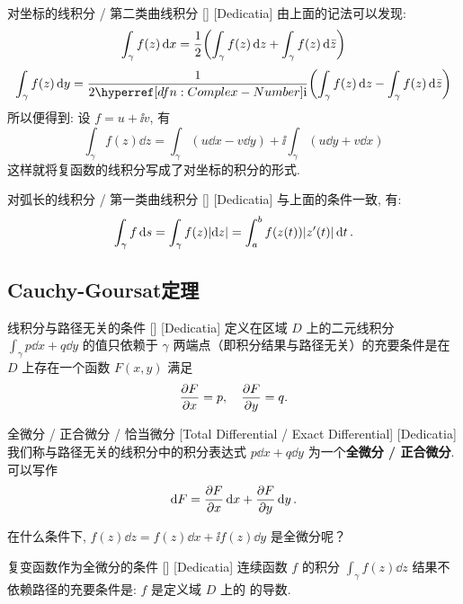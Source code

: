         \begin{ppt}
            {对坐标的线积分 / 第二类曲线积分}
            []
            [Dedicatia]
            由上面的记法可以发现: 
            \[\int_\gamma f(z)\dd{x}=\frac{1}{2}\qty(\int_\gamma f(z)\dd{z}+\int_\gamma f(z)\dd{\bar{z}})\]
            \[\int_\gamma f(z)\dd{y}=\frac{1}{2\ii}\qty(\int_\gamma f(z)\dd{z}-\int_\gamma f(z)\dd{\bar{z}})\]
            所以便得到: 设 \(f=u+\ii v\), 有
            \[\int_\gamma f(z)\dd{z}=\int_\gamma(u\dd{x}-v\dd{y})+\ii\int_\gamma(u\dd{y}+v\dd{x})\]
            这样就将复函数的线积分写成了对坐标的积分的形式. 
        \end{ppt}
        
        \begin{ppt}
            {对弧长的线积分 / 第一类曲线积分}
            []
            [Dedicatia]
            与上面的条件一致, 有: 
            \[\int_\gamma f\dd{s}=\int_\gamma f(z)\abs{\dd{z}}=\int_{a}^b f(z(t))\abs{z'(t)}\dd{t}.\]
        \end{ppt}

    \subsection{Cauchy-Goursat定理}

        \begin{thm}
            {线积分与路径无关的条件}
            []
            [Dedicatia]
            定义在区域 \(D\) 上的二元线积分 \(\int_\gamma p\dd{x}+q\dd{y}\) 的值只依赖于 \(\gamma\) 两端点（即积分结果与路径无关）的充要条件是在 \(D\) 上存在一个函数 \(F(x,y)\) 满足
            \[\pdv{F}{x}=p,\quad\pdv{F}{y}=q.\]
        \end{thm}

        \begin{dfn}
            {全微分 / 正合微分 / 恰当微分}
            [Total Differential / Exact Differential]
            [Dedicatia]
            我们称与路径无关的线积分中的积分表达式 \(p\dd{x}+q\dd{y}\) 为一个\textbf{全微分 / 正合微分}. 可以写作
            \[\dd{F}=\pdv{F}{x}\dd{x}+\pdv{F}{y}\dd{y}.\]
        \end{dfn}

        在什么条件下,  \(f(z)\dd{z}=f(z)\dd{x}+\ii f(z)\dd{y}\) 是全微分呢？

        \begin{crl}
            {复变函数作为全微分的条件}
            []
            [Dedicatia]
            连续函数 \(f\) 的积分 \(\int_\gamma f(z)\dd{z}\) 结果不依赖路径的充要条件是:  \(f\) 是定义域 \(D\) 上的\Analytic{} 的导数. 
        \end{crl}

